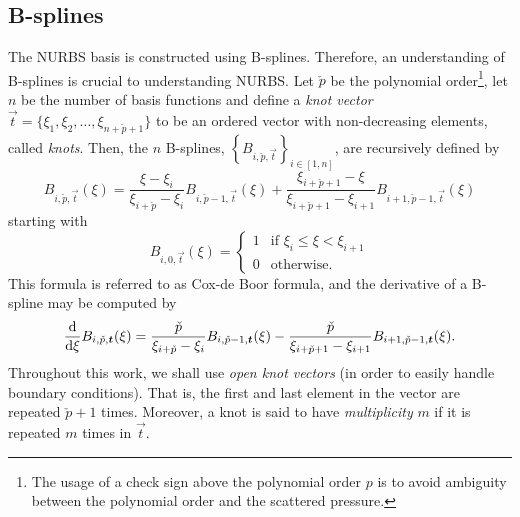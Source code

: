 \subsection{B-splines}
\renewcommand{\Xi}{{\vec{t}}}
The NURBS basis is constructed using B-splines. Therefore, an understanding of B-splines is crucial to understanding NURBS. Let $\check{p}$ be the polynomial order\footnote{The usage of a check sign above the polynomial order $p$ is to avoid ambiguity between the polynomial order and the scattered pressure.}, let $n$ be the number of basis functions and define a \textit{knot vector} $\Xi = \{\xi_1,\xi_2,\dots,\xi_{n+\check{p}+1}\}$ to be an ordered vector with non-decreasing elements, called \textit{knots}. Then, the $n$ B-splines, $\left\{B_{i,\check{p},\Xi}\right\}_{i\in [1,n]}$, are recursively defined by
\begin{equation*}
	B_{i,\check{p},\Xi}(\xi) = \frac{\xi-\xi_i}{\xi_{i+\check{p}}-\xi_i}B_{i,\check{p}-1,\Xi}(\xi)+\frac{\xi_{i+\check{p}+1} - \xi}{\xi_{i+\check{p}+1} -\xi_{i+1}}B_{i+1,\check{p}-1,\Xi}(\xi)
\end{equation*}
starting with
\begin{equation}\label{Eq:orderOneBspline}
	B_{i,0,\Xi}(\xi)=\begin{cases}
		1 & \text{if } \xi_i\leq \xi < \xi_{i+1}\\
		0 & \text{otherwise.}
	\end{cases}
\end{equation}
This formula is referred to as Cox-de Boor formula, and the derivative of a B-spline may be computed by
\begin{equation}\label{Eq:derivBspline}
	\frac{\diff}{\diff\xi} B_{i,\check{p},\Xi}(\xi) = \frac{\check{p}}{\xi_{i+\check{p}}-\xi_{i}}B_{i,\check{p}-1,\Xi}(\xi)-\frac{\check{p}}{\xi_{i+\check{p}+1}-\xi_{i+1}}B_{i+1,\check{p}-1,\Xi}(\xi).
\end{equation} 
Throughout this work, we shall use \textit{open knot vectors} (in order to easily handle boundary conditions). That is, the first and last element in the vector are repeated $\check{p}+1$ times. Moreover, a knot is said to have \textit{multiplicity} $m$ if it is repeated $m$ times in $\Xi$.

